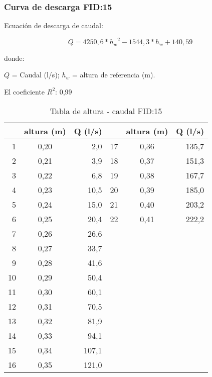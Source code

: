 \documentclass[]{article}
\begin{document}
\subsubsection{Curva de descarga FID:15}\label{CD FID:15}

Ecuación de descarga de caudal:

\[Q = 4250,6* {{h_w}^2} - 1544,3* h_w + 140,59\]

donde:

\(Q\) = Caudal (l/s); \(h_w\) = altura de referencia (m).

El coeficiente \(R^2\): 0,99


\begin{table}[H]

\caption{Tabla de altura - caudal FID:15}
\centering

\begin{center}
\begingroup\fontsize{10pt}{11pt}\selectfont
\begin{tabular}{rcrrcr}
  \hline
 & altura (m) & Q (l/s) &  & altura (m) & Q (l/s) \\ 
  \hline
  1 & 0,20 & 2,0 &  17 & 0,36 & 135,7 \\ 
    2 & 0,21 & 3,9 &  18 & 0,37 & 151,3 \\ 
    3 & 0,22 & 6,8 &  19 & 0,38 & 167,7 \\ 
    4 & 0,23 & 10,5 &  20 & 0,39 & 185,0 \\ 
    5 & 0,24 & 15,0 &  21 & 0,40 & 203,2 \\ 
    6 & 0,25 & 20,4 &  22 & 0,41 & 222,2 \\ 
    7 & 0,26 & 26,6 &  &  &  \\ 
    8 & 0,27 & 33,7 &  &  &  \\ 
    9 & 0,28 & 41,6 &  &  &  \\ 
   10 & 0,29 & 50,4 &  &  &  \\ 
   11 & 0,30 & 60,1 &  &  &  \\ 
   12 & 0,31 & 70,5 &  &  &  \\ 
   13 & 0,32 & 81,9 &  &  &  \\ 
   14 & 0,33 & 94,1 &  &  &  \\ 
   15 & 0,34 & 107,1 &  &  &  \\ 
   16 & 0,35 & 121,0 &  &  &  \\ 
   \hline
\end{tabular}
\endgroup\end{center}
\end{table}

\clearpage
\end{document}
